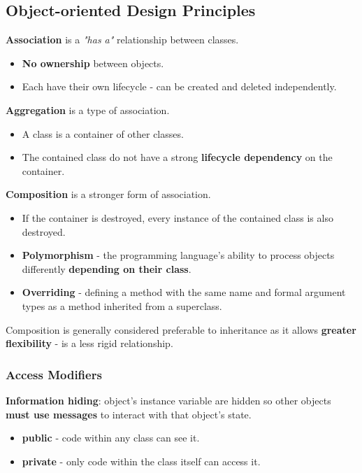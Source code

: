\subsection{Object-oriented Design Principles}

\textbf{Association} is a \emph{"has a"} relationship between classes.
\begin{itemize}
    \item \textbf{No ownership} between objects.
    \item Each have their own lifecycle - can be created and deleted independently.
\end{itemize}

\textbf{Aggregation} is a type of association.
\begin{itemize}
    \item A class is a container of other classes.
    \item The contained class do not have a strong \textbf{lifecycle dependency} on the container.
\end{itemize}

\textbf{Composition} is a stronger form of association.
\begin{itemize}
    \item If the container is destroyed, every instance of the contained class is also destroyed.
\end{itemize}

\begin{itemize}
    \item \textbf{Polymorphism} - the programming language's ability to process objects differently \textbf{depending on their class}.
    \item \textbf{Overriding} - defining a method with the same name and formal argument types as a method inherited from a superclass.
\end{itemize}

Composition is generally considered preferable to inheritance as it allows \textbf{greater flexibility} - is a less rigid relationship.

\subsubsection*{Access Modifiers}

\textbf{Information hiding}: object's instance variable are hidden so other objects \textbf{must use messages} to interact with that object's state.

\begin{itemize}
    \item \textbf{public} - code within any class can see it.
    \item \textbf{private} - only code within the class itself can access it.
\end{itemize}

